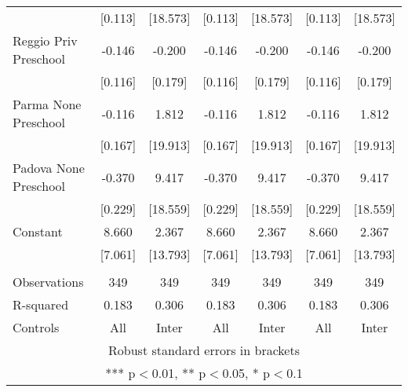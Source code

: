 \begin{tabular}{lcccccc}
 & [0.113] & [18.573] & [0.113] & [18.573] & [0.113] & [18.573] \\
Reggio Priv Preschool & -0.146 & -0.200 & -0.146 & -0.200 & -0.146 & -0.200 \\
 & [0.116] & [0.179] & [0.116] & [0.179] & [0.116] & [0.179] \\
Parma None Preschool & -0.116 & 1.812 & -0.116 & 1.812 & -0.116 & 1.812 \\
 & [0.167] & [19.913] & [0.167] & [19.913] & [0.167] & [19.913] \\
Padova None Preschool & -0.370 & 9.417 & -0.370 & 9.417 & -0.370 & 9.417 \\
 & [0.229] & [18.559] & [0.229] & [18.559] & [0.229] & [18.559] \\
Constant & 8.660 & 2.367 & 8.660 & 2.367 & 8.660 & 2.367 \\
 & [7.061] & [13.793] & [7.061] & [13.793] & [7.061] & [13.793] \\
 &  &  &  &  &  &  \\
Observations & 349 & 349 & 349 & 349 & 349 & 349 \\
R-squared & 0.183 & 0.306 & 0.183 & 0.306 & 0.183 & 0.306 \\
 Controls & All & Inter & All & Inter & All & Inter \\ \hline
\multicolumn{7}{c}{ Robust standard errors in brackets} \\
\multicolumn{7}{c}{ *** p$<$0.01, ** p$<$0.05, * p$<$0.1} \\
\end{tabular}
